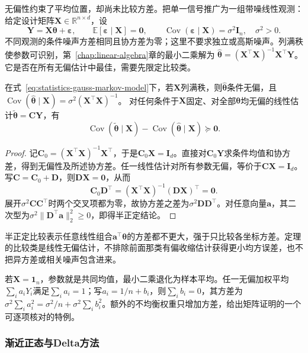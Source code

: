无偏性约束了平均位置，却尚未比较方差。把单一信号推广为一组带噪线性观测：给定设计矩阵\(\bm X\in\mathbb R^{n\times d}\)，设
\begin{equation}
  \bm Y=\bm X\bm\theta+\bm\varepsilon,\qquad
  \mathbb E[\bm\varepsilon\mid\bm X]=\bm0,\qquad
  \operatorname{Cov}(\bm\varepsilon\mid\bm X)=\sigma^2\bm I_n,
  \quad\sigma^2>0.
  \label{eq:statistics-gauss-markov-model}
\end{equation}
不同观测的条件噪声方差相同且协方差为零；这里不要求独立或高斯噪声。列满秩使参数可识别，第~\ref{chap:linear-algebra}章的最小二乘解为
\(\widehat{\bm\theta}=(\bm X^\top\bm X)^{-1}\bm X^\top\bm Y\)。它是否在所有无偏估计中最佳，需要先限定比较类。
\begin{theorem}
  \label{thm:statistics-gauss-markov}
  在式~\eqref{eq:statistics-gauss-markov-model}下，若\(\bm X\)列满秩，则\(\widehat{\bm\theta}\)条件无偏，且
  \(\operatorname{Cov}(\widehat{\bm\theta}\mid\bm X)=\sigma^2(\bm X^\top\bm X)^{-1}\)。
  对任何条件于\(\bm X\)固定、对全部\(\bm\theta\)均无偏的线性估计\(\widetilde{\bm\theta}=\bm C\bm Y\)，有
  \[
    \operatorname{Cov}(\widetilde{\bm\theta}\mid\bm X)
    -\operatorname{Cov}(\widehat{\bm\theta}\mid\bm X)\succeq\bm0.
  \]
\end{theorem}
\begin{proof}
记\(\bm C_0=(\bm X^\top\bm X)^{-1}\bm X^\top\)，于是\(\bm C_0\bm X=\bm I_d\)。直接对\(\bm C_0\bm Y\)求条件均值和协方差，得到无偏性及所述协方差。任一线性估计对所有参数无偏，等价于\(\bm C\bm X=\bm I_d\)。写\(\bm C=\bm C_0+\bm D\)，则\(\bm D\bm X=\bm0\)，从而
\[
  \bm C_0\bm D^\top
  =(\bm X^\top\bm X)^{-1}(\bm D\bm X)^\top=\bm0.
\]
展开\(\sigma^2\bm C\bm C^\top\)时两个交叉项都为零，故协方差之差为\(\sigma^2\bm D\bm D^\top\)。对任意向量\(\bm a\)，其二次型为\(\sigma^2\|\bm D^\top\bm a\|_2^2\geq0\)，即得半正定结论。
\end{proof}
半正定比较表示任意线性组合\(\bm a^\top\bm\theta\)的方差都不更大，强于只比较各坐标方差。定理的比较类是线性无偏估计，不排除前面那类有偏收缩估计获得更小均方误差，也不把异方差或相关噪声包含进来。

若\(\bm X=\bm1_n\)，参数就是共同均值，最小二乘退化为样本平均。任一无偏加权平均\(\sum_i a_iY_i\)满足\(\sum_i a_i=1\)；写\(a_i=1/n+b_i\)，则\(\sum_i b_i=0\)，其方差为
\(\sigma^2\sum_i a_i^2=\sigma^2/n+\sigma^2\sum_i b_i^2\)。额外的不均衡权重只增加方差，给出矩阵证明的一个可逐项核对的特例。

\subsubsection{渐近正态与Delta方法}

